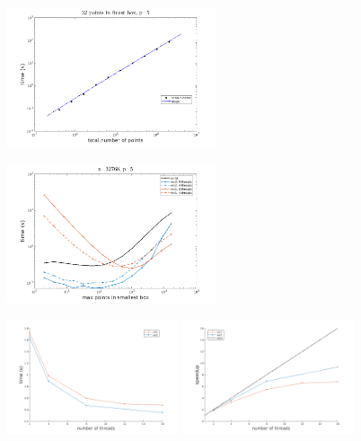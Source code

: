 \documentclass{article}
\begin{document}
\begin{figure}
  \centering
  \includegraphics[width=0.55\textwidth]{./figures/varying_n_m32_p5.png}
\end{figure}

\begin{figure}
  \centering
  \includegraphics[width=0.55\textwidth]{./figures/varying_m_n32768_p5_4_8.png}
\end{figure}

\begin{figure}
  \centering
  \includegraphics[width=0.45\textwidth]{./figures/strong_scalability.png} %
  \includegraphics[width=0.45\textwidth]{./figures/strong_scalability2.png} 
\end{figure}
\end{document}

